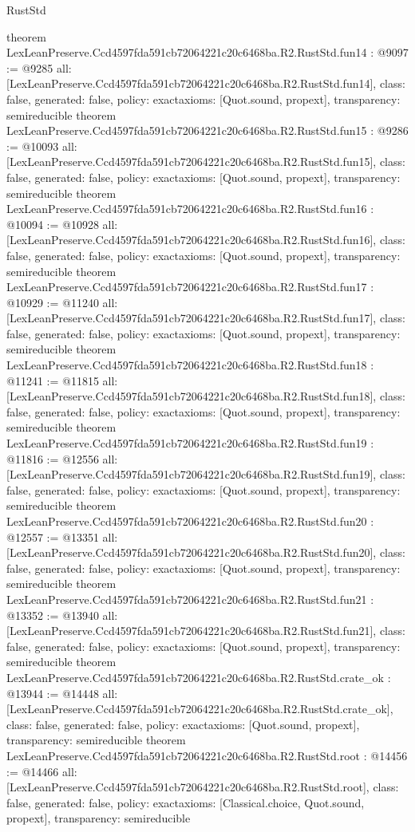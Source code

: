 \begin{lexlean}{RustStd}
\begin{coremodule}
{}
theorem LexLeanPreserve.Ccd4597fda591cb72064221c20c6468ba.R2.RustStd.fun14 : @9097 := @9285 {
  all: [LexLeanPreserve.Ccd4597fda591cb72064221c20c6468ba.R2.RustStd.fun14],
  class: false,
  generated: false,
  policy: exact{axioms: [Quot.sound, propext]},
  transparency: semireducible
}
theorem LexLeanPreserve.Ccd4597fda591cb72064221c20c6468ba.R2.RustStd.fun15 : @9286 := @10093 {
  all: [LexLeanPreserve.Ccd4597fda591cb72064221c20c6468ba.R2.RustStd.fun15],
  class: false,
  generated: false,
  policy: exact{axioms: [Quot.sound, propext]},
  transparency: semireducible
}
theorem LexLeanPreserve.Ccd4597fda591cb72064221c20c6468ba.R2.RustStd.fun16 : @10094 := @10928 {
  all: [LexLeanPreserve.Ccd4597fda591cb72064221c20c6468ba.R2.RustStd.fun16],
  class: false,
  generated: false,
  policy: exact{axioms: [Quot.sound, propext]},
  transparency: semireducible
}
theorem LexLeanPreserve.Ccd4597fda591cb72064221c20c6468ba.R2.RustStd.fun17 : @10929 := @11240 {
  all: [LexLeanPreserve.Ccd4597fda591cb72064221c20c6468ba.R2.RustStd.fun17],
  class: false,
  generated: false,
  policy: exact{axioms: [Quot.sound, propext]},
  transparency: semireducible
}
theorem LexLeanPreserve.Ccd4597fda591cb72064221c20c6468ba.R2.RustStd.fun18 : @11241 := @11815 {
  all: [LexLeanPreserve.Ccd4597fda591cb72064221c20c6468ba.R2.RustStd.fun18],
  class: false,
  generated: false,
  policy: exact{axioms: [Quot.sound, propext]},
  transparency: semireducible
}
theorem LexLeanPreserve.Ccd4597fda591cb72064221c20c6468ba.R2.RustStd.fun19 : @11816 := @12556 {
  all: [LexLeanPreserve.Ccd4597fda591cb72064221c20c6468ba.R2.RustStd.fun19],
  class: false,
  generated: false,
  policy: exact{axioms: [Quot.sound, propext]},
  transparency: semireducible
}
theorem LexLeanPreserve.Ccd4597fda591cb72064221c20c6468ba.R2.RustStd.fun20 : @12557 := @13351 {
  all: [LexLeanPreserve.Ccd4597fda591cb72064221c20c6468ba.R2.RustStd.fun20],
  class: false,
  generated: false,
  policy: exact{axioms: [Quot.sound, propext]},
  transparency: semireducible
}
theorem LexLeanPreserve.Ccd4597fda591cb72064221c20c6468ba.R2.RustStd.fun21 : @13352 := @13940 {
  all: [LexLeanPreserve.Ccd4597fda591cb72064221c20c6468ba.R2.RustStd.fun21],
  class: false,
  generated: false,
  policy: exact{axioms: [Quot.sound, propext]},
  transparency: semireducible
}
theorem LexLeanPreserve.Ccd4597fda591cb72064221c20c6468ba.R2.RustStd.crate_ok : @13944 := @14448 {
  all: [LexLeanPreserve.Ccd4597fda591cb72064221c20c6468ba.R2.RustStd.crate_ok],
  class: false,
  generated: false,
  policy: exact{axioms: [Quot.sound, propext]},
  transparency: semireducible
}
theorem LexLeanPreserve.Ccd4597fda591cb72064221c20c6468ba.R2.RustStd.root : @14456 := @14466 {
  all: [LexLeanPreserve.Ccd4597fda591cb72064221c20c6468ba.R2.RustStd.root],
  class: false,
  generated: false,
  policy: exact{axioms: [Classical.choice, Quot.sound, propext]},
  transparency: semireducible
}


\end{coremodule}
\end{lexlean}
